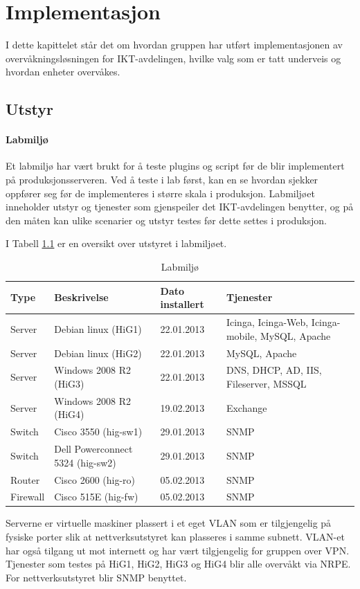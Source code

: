 \chapter{Implementasjon}
I dette kapittelet står det om hvordan gruppen har utført implementasjonen av overvåkningsløsningen for IKT-avdelingen, hvilke valg som er tatt underveis og hvordan enheter overvåkes.
\section{Utstyr}
\subsubsection{Labmiljø}
Et labmiljø har vært brukt for å teste plugins og script før de blir implementert på produksjonsserveren. Ved å teste i lab først, kan en se hvordan sjekker oppfører seg før de implementeres i større skala i produksjon. Labmiljøet inneholder utstyr og tjenester som gjenspeiler det IKT-avdelingen benytter, og på den måten kan ulike scenarier og utstyr testes før dette settes i produksjon.

I Tabell \ref{labmiljo} er en oversikt over utstyret i labmiljøet.
\begin{changemargin}{-1cm}{-1cm}
\begin{table}
\begin{center}
\begin{tabular}{ | l | l | l | p{4cm} |} \hline
	\textbf{Type} & \textbf{Beskrivelse} & \textbf{Dato installert} & \textbf{Tjenester} \\ \hline
	Server & Debian linux (HiG1) & 22.01.2013 & Icinga, Icinga-Web, Icinga-mobile, MySQL, Apache \\ \hline
	Server & Debian linux (HiG2) & 22.01.2013 &	MySQL, Apache \\ \hline
	Server & Windows 2008 R2 (HiG3) & 22.01.2013 & DNS, DHCP, AD, IIS, Fileserver, MSSQL \\ \hline
	Server & Windows 2008 R2 (HiG4) & 19.02.2013 & Exchange \\ \hline 
	Switch & Cisco 3550 (hig-sw1) &	29.01.2013 & SNMP \\ \hline
	Switch & Dell Powerconnect 5324 (hig-sw2) & 29.01.2013 & SNMP \\ \hline
	Router & Cisco 2600 (hig-ro) & 05.02.2013 & SNMP \\ \hline 
	Firewall & Cisco 515E (hig-fw) & 05.02.2013 & SNMP \\ \hline
\end{tabular}
\caption{Labmiljø}
\label{labmiljo}
\end{center}
\end{table}
\end{changemargin}
Serverne er virtuelle maskiner plassert i et eget VLAN som er tilgjengelig på fysiske porter slik at nettverksutstyret kan plasseres i samme subnett. VLAN-et har også tilgang ut mot internett og har vært tilgjengelig for gruppen over VPN. Tjenester som testes på HiG1, HiG2, HiG3 og HiG4 blir alle overvåkt via NRPE. For nettverksutstyret blir SNMP benyttet.

